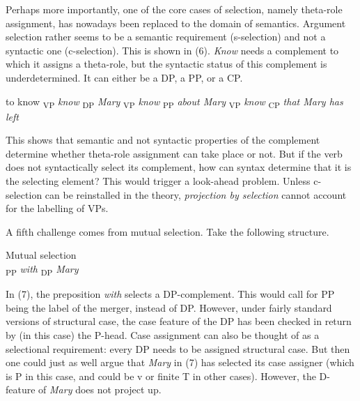 \documentclass[output=paper
,modfonts
,nonflat]{langsci/langscibook}
\begin{document}
Perhaps more importantly, one of the core cases of selection, namely theta-role assignment, has nowadays been replaced to the domain of semantics. Argument selection rather seems to be a semantic requirement (s-selection) and not a syntactic one (c-selection). This is shown in (6). \textit{Know} needs a complement to which it assigns a theta-role, but the syntactic status of this complement is underdetermined. It can either be a DP, a PP, or a CP. 

\begin{exe}
\ex to know
	\xlist
	\ex {\lbrack}\textsubscript{VP} \textit{know} {\lbrack}\textsubscript{DP}
		\textit{Mary}{\rbrack}{\rbrack}
	\ex {\lbrack}\textsubscript{VP} \textit{know} {\lbrack}\textsubscript{PP} 	
		\textit{about Mary}{\rbrack}{\rbrack}
	\ex {\lbrack}\textsubscript{VP} \textit{know} {\lbrack}\textsubscript{CP} 		
		\textit{that Mary has left}{\rbrack}{\rbrack}
	\endxlist
\end{exe}
This shows that semantic and not syntactic properties of the complement determine whether theta-role assignment can take place or not. But if the verb does not syntactically select its complement, how can syntax determine that it is the selecting element? This would trigger a look-ahead problem. Unless c-selection can be reinstalled in the theory, \textit{projection by selection} cannot account for the labelling of VPs. 

A fifth challenge comes from mutual selection. Take the following structure.

\begin{exe}
\ex Mutual selection \\
	{\lbrack}\textsubscript{PP} \textit{with} {\lbrack}\textsubscript{DP} \textit{Mary}{\rbrack}{\rbrack}
\end{exe}
In (7), the preposition \textit{with} selects a DP-complement. This would call for PP being the label of the merger, instead of DP. However, under fairly standard versions of structural case, the case feature of the DP has been checked in return by (in this case) the P-head. Case assignment can also be thought of as a selectional requirement: every DP needs to be assigned structural case. But then one could just as well argue that \textit{Mary} in (7) has selected its case assigner (which is P in this case, and could be v or finite T in other cases). However, the {\lbrack}D{\rbrack}-feature of \textit{Mary} does not project up.
\end{document}
